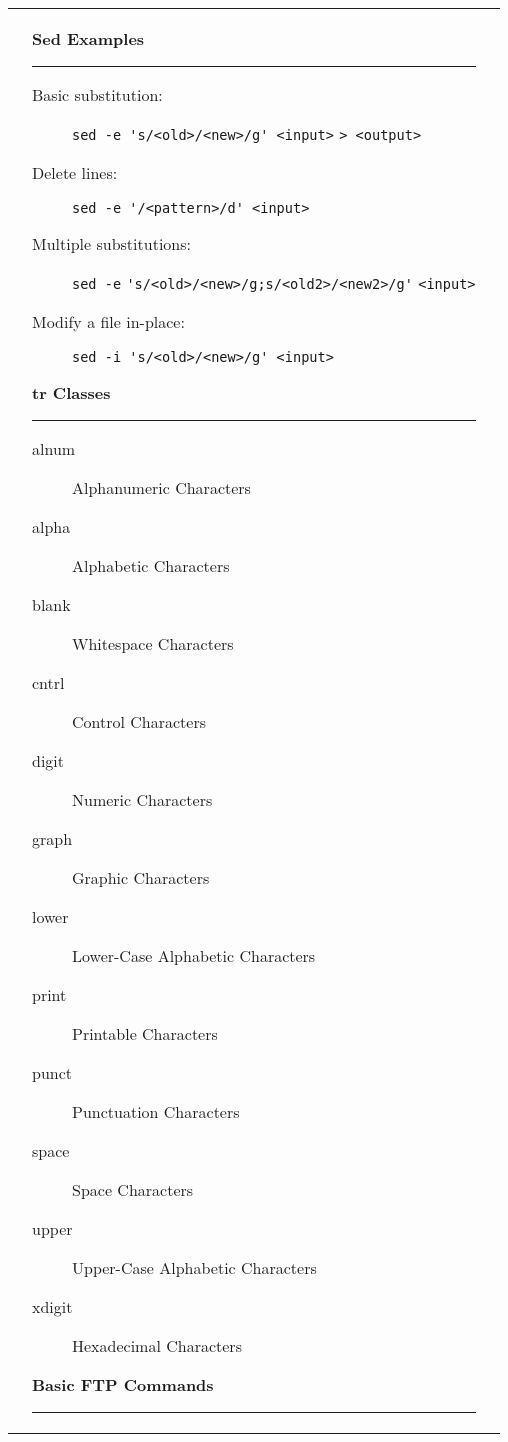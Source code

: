 \documentclass[landscape]{article}
\begin{document}
\begin{tabular*}{10.5in}{|p{2.9in}|p{2.9in}|p{2.9in}|}
\begin{flushleft}
    \end{flushleft}
    &
    \begin{flushleft}
        \textbf{\large{Sed Examples}}
        \rule{2.9in}{.5pt}
        \small
        \begin{description}
            \item[Basic substitution:]
                {\verb!sed -e 's/<old>/<new>/g' <input>!
                 \verb!> <output>!}
            \item[Delete lines:]
                {\verb!sed -e '/<pattern>/d' <input>!}
            \item[Multiple substitutions:]
                {\verb!sed -e!
                 \verb!'s/<old>/<new>/g;s/<old2>/<new2>/g'!
                 \verb!<input>!}
             \item[Modify a file in-place:]
                {\verb!sed -i 's/<old>/<new>/g' <input>!}
        \end{description}
        \textbf{\large{tr Classes}}
        \rule{2.9in}{.5pt}
        \small
        \begin{description}
            \item[alnum]
                {Alphanumeric Characters}
            \item[alpha]
                {Alphabetic Characters}
            \item[blank]
                {Whitespace Characters}
            \item[cntrl]
                {Control Characters}
            \item[digit]
                {Numeric Characters}
            \item[graph]
                {Graphic Characters}
            \item[lower]
                {Lower-Case Alphabetic Characters}
            \item[print]
                {Printable Characters}
            \item[punct]
                {Punctuation Characters}
            \item[space]
                {Space Characters}
            \item[upper]
                {Upper-Case Alphabetic Characters}
            \item[xdigit]
                {Hexadecimal Characters}
        \end{description}
        \textbf{\large{Basic FTP Commands}}
        \rule{2.9in}{.5pt}
        \small
        \begin{description}

\end{description}
\end{flushleft}
\end{tabular*}
\end{document}
